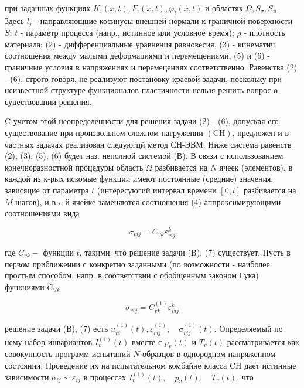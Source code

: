 \documentclass[10pt]{article}
\begin{document}
при заданных функциях $K_{i}(x, t), F_{i}(x, t), \varphi_{i}(x, t)$ и областях $\Omega, S_{\sigma}, S_{u}$. Здесь $l_{j}$ - направляющцие косинусы внешней нормали к граничной поверхности $S$; $t$ - параметр процесса (напр., истинное или условное время); $\rho$ - плотность материала; (2) - дифференциальные уравнения равновесия, (3) - кинематич. соотношения между малыми деформациями и перемещениями, (5) и (6) - граничные условия в напряжениях и перемецениях соответственно. Равенства (2) - (6), строго говоря, не реализуют постановку краевой задачи, поскольку при неизвестной структуре функционалов пластичности нельзя решить вопрос о суцествовании решения.



C учетом этой неопределенности для решения задачи (2) - (6), допуская его существование при произвольном сложном нагружении $(\mathrm{CH})$, предложен и в частных задачах реализован следуюгцй метод СН-ЭВМ. Ниже система равенств (2), (3), (5), (6) будет наз. неполной системой (В). В связи с использованием конечноразностной процедуры область $\Omega$ разбивается на $N$ ячеек (элементов), в каждой из к-рых искомые функции имеют постоянные (средние) значения, зависяцие от параметра $t$ (интересуюгий интервал времени $[0, t]$ разбивается на $M$ шагов), и в $v$-й ячейке заменяются соотношения (4) аппроксимирующими соотношениями вида



\[

\sigma_{v i j}=C_{v k} \varepsilon_{v i j}^{k}

\]



где $C_{v k}-$ функции $t$, такими, что решение задачи (B), (7) существует. Пусть в первом приближении с конкретно заданными (по возможности - наиболее простым способом, напр. в соответствии с обобщенным законом Гука) функциями $C_{\vee k}$



\[

\sigma_{v i j}=C_{v k}^{(1)} \varepsilon_{v i j}^{k}

\]



решение задачи (В), (7) есть $u_{v i}^{(1)}(t), \varepsilon_{v i j}^{(1)}, \quad \sigma_{v i j}^{(1)}(t)$. Определяемый по нему набор инвариантов $I_{v}^{(1)}(t)$ вместе с $p_{v}(t)$ и $T_{v}(t)$ рассматривается как совокупность программ испытаний $N$ образцов в однородном напряженном состоянии. Проведение их на испытательном комбайне класса $\mathrm{CH}$ дает истинные зависимости $\sigma_{i j} \sim \varepsilon_{i j}$ в процессах $I_{v}^{(1)}(t), \quad p_{v}(t), \quad T_{v}(t)$, что
\end{document}
